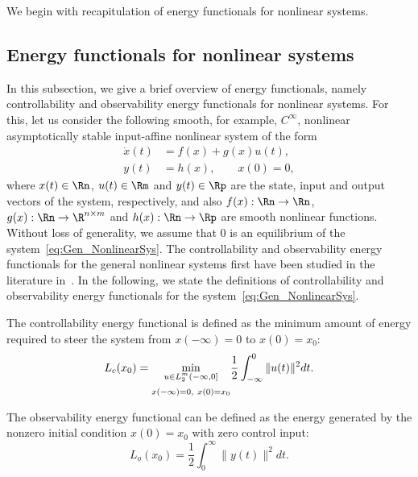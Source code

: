 We begin with recapitulation of energy functionals for nonlinear systems.
\subsection{Energy functionals for nonlinear systems}
In this subsection, we give a brief overview of energy functionals, namely controllability and observability energy functionals for nonlinear systems. For this, let us consider the following smooth, for example, $C^\infty$, nonlinear asymptotically stable input-affine nonlinear system of the form
\begin{equation}\label{eq:Gen_NonlinearSys}
 \begin{aligned}
  \dot{x}(t) &=  f(x) + g(x)u(t),\\
  y(t) &= h(x),\qquad x(0) = 0,
 \end{aligned}
\end{equation}
where $x(t) \in \Rn$, $u(t) \in \Rm$ and $y(t)\in\Rp$ are the state, input and output vectors of the system, respectively, and also $f(x) : \Rn \rightarrow \Rn$, $g(x) :\Rn \rightarrow \R^{n\times m}$ and $h(x) : \Rn\rightarrow \Rp$ are smooth nonlinear functions. Without loss of generality, we assume  that $0$ is an equilibrium of  the system~\eqref{eq:Gen_NonlinearSys}.  The controllability and observability energy functionals for the general nonlinear systems  first have been studied in the literature in~\cite{morSch93}. In the following, we state the definitions of controllability and observability energy functionals for the system~\eqref{eq:Gen_NonlinearSys}.
\begin{definition}\cite{morSch93}
 The controllability energy functional is defined as the minimum amount of energy required to steer the system from $x(-\infty) = 0$ to $x(0) = x_0$:
 \begin{equation*}
  L_c(x_0) = \underset{\begin{subarray}{c}
 u\in L^m_2(-\infty,0] \\[5pt]
 x(-\infty)=0,~x(0) = x_0
  \end{subarray}  }{\min} \dfrac{1}{2}\int_{-\infty}^0 \|u(t)\|^2dt.
 \end{equation*}
\end{definition}
\begin{definition}\cite{morSch93}\label{def:obser1}
The observability energy functional can be defined as the  energy generated by the nonzero initial condition $x(0) = x_0$ with zero control input:
\begin{equation*}
 L_o(x_0) = \dfrac{1}{2}\int_0^\infty \|y(t)\|^2dt.
 \end{equation*}
\end{definition}
